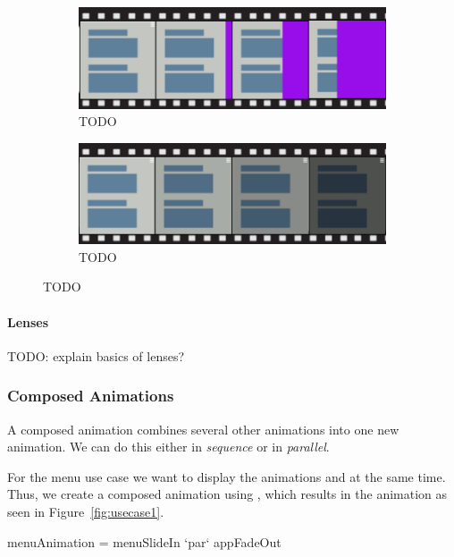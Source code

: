 \begin{figure}[H]
\centering

\begin{subfigure}[h]{0.75\textwidth}
\centering
\includegraphics[scale=0.4]{pictures/usecase1basic1.png}
\caption{TODO}
\label{fig:usecase1basic1}
\end{subfigure}

\begin{subfigure}[h]{0.75\textwidth}
\centering
\includegraphics[scale=0.4]{pictures/usecase1basic2.png}
\caption{TODO}
\label{fig:usecase1basic2}
\end{subfigure}

\caption{TODO}
\label{fig:usecase1basic}
\end{figure}

\paragraph{Lenses} TODO: explain basics of lenses?

\subsubsection{Composed Animations}

A composed animation combines several other animations into one new animation. We can do this either in \emph{sequence} or in \emph{parallel}.

For the menu use case we want to display the animations  and  at the same time. Thus, we create a composed animation using ,  which results in the animation as seen in Figure~\ref{fig:usecase1}.

\begin{spec}
menuAnimation = menuSlideIn `par` appFadeOut
\end{spec}

